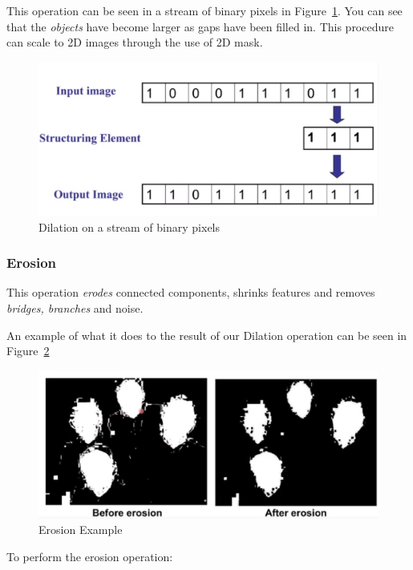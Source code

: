 \documentclass{article}
\begin{document}
This operation can be seen in a stream of binary pixels in Figure~\ref{fig:dilation-eg2}. You can see that the \textit{objects}  have become larger as gaps have been filled in. This procedure can scale to 2D images through the use of 2D mask.

\begin{figure}[ht]
  \centering
  \includegraphics[scale=0.2]{figures/l3-5.png}
  \caption{\label{fig:dilation-eg2} Dilation on a stream of binary pixels}
\end{figure}



\subsubsection{Erosion}

This operation \textit{erodes}  connected components, shrinks features and removes \textit{bridges, branches}  and noise.

An example of what it does to the result of our Dilation operation can be seen in Figure~\ref{fig:erosion-eg}

\begin{figure}[ht]
  \centering
  \includegraphics[scale=0.3]{figures/l3-4.png}
  \caption{\label{fig:erosion-eg} Erosion Example }
\end{figure}

To perform the erosion operation:
\end{document}
